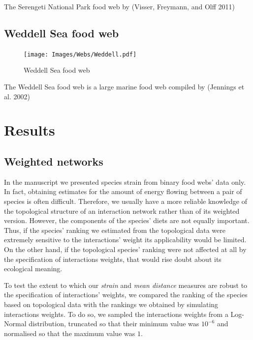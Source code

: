 \documentclass[11pt,article,oneside]{memoir}
\begin{document}
The Serengeti National Park food web by (Visser, Freymann, and Olff
2011)

\newpage

\subsection{Weddell Sea food web}\label{weddell-sea-food-web}

\begin{figure}[htbp]
\centering
\texttt{[image: Images/Webs/Weddell.pdf]}
\caption{Weddell Sea food web}
\end{figure}

The Weddell Sea food web is a large marine food web compiled by
(Jennings et al. 2002)

\newpage

\section{Results}\label{results}

\subsection{Weighted networks}\label{weighted-networks}

In the manuscript we presented species strain from binary food webs'
data only. In fact, obtaining estimates for the amount of energy flowing
between a pair of species is often difficult. Therefore, we usually have
a more reliable knowledge of the topological structure of an interaction
network rather than of its weighted version. However, the components of
the species' diets are not equally important. Thus, if the species'
ranking we estimated from the topological data were extremely sensitive
to the interactions' weight its applicability would be limited. On the
other hand, if the topological species' ranking were not affected at all
by the specification of interactions weights, that would rise doubt
about its ecological meaning.

To test the extent to which our \emph{strain} and \emph{mean distance}
measures are robust to the specification of interactions' weights, we
compared the ranking of the species based on topological data with the
rankings we obtained by simulating interactions weights. To do so, we
sampled the interactions weights from a Log-Normal distribution,
truncated so that their minimum value was \(10^{-6}\) and normalised so
that the maximum value was \(1\).
\end{document}
